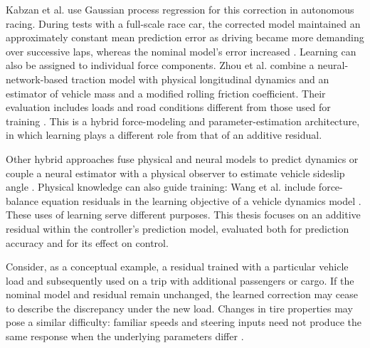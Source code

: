 \documentclass[12pt,a4paper]{report}
\begin{document}
Kabzan et al. use Gaussian process regression for this correction in autonomous racing. During tests with a full-scale race car, the corrected model maintained an approximately constant mean prediction error as driving became more demanding over successive laps, whereas the nominal model's error increased \cite{Kabzan2019LearningBased}. Learning can also be assigned to individual force components. Zhou et al. combine a neural-network-based traction model with physical longitudinal dynamics and an estimator of vehicle mass and a modified rolling friction coefficient. Their evaluation includes loads and road conditions different from those used for training \cite{Zhou2025Hybrid}. This is a hybrid force-modeling and parameter-estimation architecture, in which learning plays a different role from that of an additive residual.

Other hybrid approaches fuse physical and neural models to predict dynamics or couple a neural estimator with a physical observer to estimate vehicle sideslip angle \cite{Cheng2025Deep,Bertipaglia2024An}. Physical knowledge can also guide training: Wang et al. include force-balance equation residuals in the learning objective of a vehicle dynamics model \cite{Wang2027Adaptive}. These uses of learning serve different purposes. This thesis focuses on an additive residual within the controller's prediction model, evaluated both for prediction accuracy and for its effect on control.

%
%
%
%
Consider, as a conceptual example, a residual trained with a particular vehicle load and subsequently used on a trip with additional passengers or cargo. If the nominal model and residual remain unchanged, the learned correction may cease to describe the discrepancy under the new load. Changes in tire properties may pose a similar difficulty: familiar speeds and steering inputs need not produce the same response when the underlying parameters differ \cite{Yeneneh2026AutoDyn}.
\end{document}
